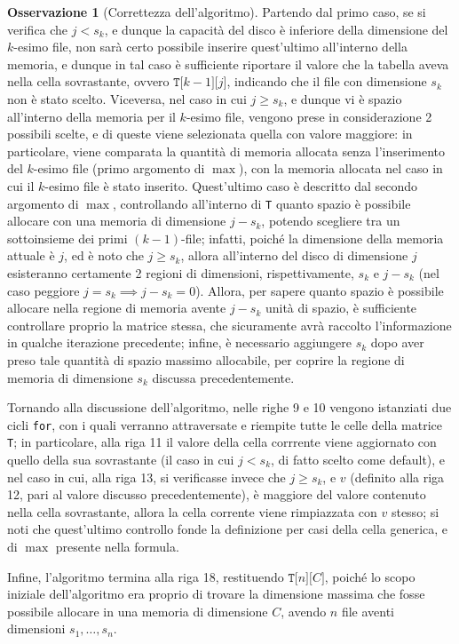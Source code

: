 \documentclass[14pt]{extreport}
\theoremstyle{definition}
\theoremstyle{definition}
\newtheorem{remark}{Osservazione}[subsection]
\begin{document}
\begin{remark}[Correttezza dell'algoritmo]
    Partendo dal primo caso, se si verifica che $j < s_k$, e dunque la capacità del disco è inferiore della dimensione del $k$-esimo file, non sarà certo possibile inserire quest'ultimo all'interno della memoria, e dunque in tal caso è sufficiente riportare il valore che la tabella aveva nella cella sovrastante, ovvero $\texttt{T[}k-1\texttt{][}j\texttt{]}$, indicando che il file con dimensione $s_k$ non è stato scelto. Viceversa, nel caso in cui $j \ge s_k$, e dunque vi è spazio all'interno della memoria per il $k$-esimo file, vengono prese in considerazione 2 possibili scelte, e di queste viene selezionata quella con valore maggiore: in particolare, viene comparata la quantità di memoria allocata senza l'inserimento del $k$-esimo file (primo argomento di $\max$), con la memoria allocata nel caso in cui il $k$-esimo file è stato inserito. Quest'ultimo caso è descritto dal secondo argomento di $\max$, controllando all'interno di \texttt{T} quanto spazio è possibile allocare con una memoria di dimensione $j - s_k$, potendo scegliere tra un sottoinsieme dei primi $(k - 1)$-file; infatti, poiché la dimensione della memoria attuale è $j$, ed è noto che $j \ge s_k$, allora all'interno del disco di dimensione $j$ esisteranno certamente 2 regioni di dimensioni, rispettivamente, $s_k$ e $j - s_k$ (nel caso peggiore $j = s_k \implies j - s_k = 0$). Allora, per sapere quanto spazio è possibile allocare nella regione di memoria avente $j - s_k$ unità di spazio, è sufficiente controllare proprio la matrice stessa, che sicuramente avrà raccolto l'informazione in qualche iterazione precedente; infine, è necessario aggiungere $s_k$ dopo aver preso tale quantità di spazio massimo allocabile, per coprire la regione di memoria di dimensione $s_k$ discussa precedentemente.

    Tornando alla discussione dell'algoritmo, nelle righe 9 e 10 vengono istanziati due cicli \texttt{for}, con i quali verranno attraversate e riempite tutte le celle della matrice \texttt{T}; in particolare, alla riga 11 il valore della cella corrrente viene aggiornato con quello della sua sovrastante (il caso in cui $j < s_k$, di fatto scelto come default), e nel caso in cui, alla riga 13, si verificasse invece che $j \ge s_k$, e $v$ (definito alla riga 12, pari al valore discusso precedentemente), è maggiore del valore contenuto nella cella sovrastante, allora la cella corrente viene rimpiazzata con $v$ stesso; si noti che quest'ultimo controllo fonde la definizione per casi della cella generica, e di $\max$ presente nella formula.

    Infine, l'algoritmo termina alla riga 18, restituendo $\texttt{T[}n\texttt{][}C\texttt{]}$, poiché lo scopo iniziale dell'algoritmo era proprio di trovare la dimensione massima che fosse possibile allocare in una memoria di dimensione $C$, avendo $n$ file aventi dimensioni $s_1, \ldots, s_n$.
\end{remark}
\end{document}
